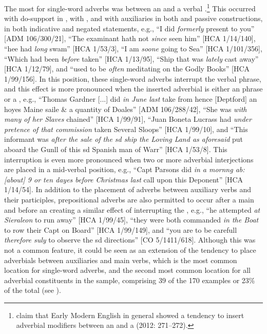 The most  for single-word adverbs was between an  and a verbal .\footnote{\citeauthor{MillwardHayes2012} claim that Early Modern English in general showed a tendency to insert adverbial modifiers between an  and a  (2012: 271–272).} This occurred with do-support in , with , and with  auxiliaries in both  and passive constructions, in both indicative and negated statements, e.g., “I did \textit{formerly} present to you” [ADM 106/300/21], “The examinant hath not \textit{since} seen him” [HCA 1/14/140], “hee had \textit{long} swam” [HCA 1/53/3], “I am \textit{soone} going to Sea” [HCA 1/101/356], “Which had been \textit{before} taken” [HCA 1/13/95], “Ship that was \textit{lately} cast away” [HCA 1/12/79], and “used to be \textit{often} meditating on the Godly Books” [HCA 1/99/156]. In this position, these single-word adverbs interrupt the verbal phrase, and this effect is more pronounced when the inserted adverbial is either an  phrase or a , e.g., “Thomas Gardner [...] did \textit{in June last} take from hence [Deptford] an hoyes Maine saile \& a quantity of Doales” [ADM 106/288/42], “She was \textit{with many of her Slaves} chained” [HCA 1/99/91],  “Juan Boneta Lucrass had \textit{under pretence of that commission} taken Several Sloops” [HCA 1/99/10], and “This informant was \textit{after the sale of the sd ship the Loving Land as aforesaid} put aboard the Gunll of this sd Spanish man of Warr” [HCA 1/53/8]. This interruption is even more pronounced when two or more adverbial interjections are placed in a mid-verbal position, e.g., “Capt Parsons did \textit{in a mornng ab:[about] 9 or ten dayes before Christmas last} call upon this Deponent” [HCA 1/14/54]. In addition to the placement of adverbs between auxiliary verbs and their participles, prepositional adverbs are also permitted to occur after a main  and before an  creating a similar effect of interrupting the , e.g., “he attempted \textit{at Sieraleon} to run away” [HCA 1/99/45], “they were both commanded \textit{in the Boat} to row their Capt on Board”  [HCA 1/99/149], and “you are to be carefull \textit{therefore suly} to observe the sd directions” [CO 5/1411/618]. Although this was not a common feature, it could be seen as an extension of the tendency to place adverbials between auxiliaries and main verbs, which is the most common location for single-word adverbs, and the second most common location for all adverbial constituents in the sample, comprising 39 of the 170 examples or 23\% of the total (see ).


